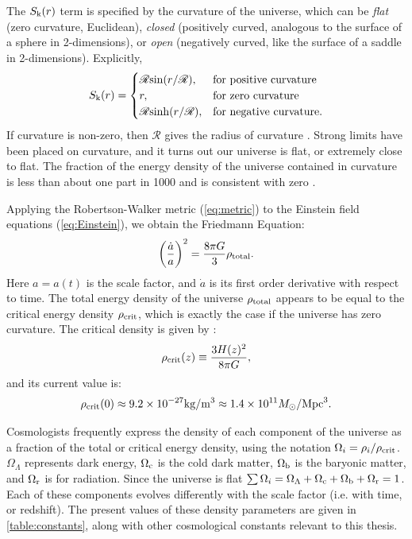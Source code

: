 The $S_{\rm k}(r)$ term is specified by the curvature of the universe, which can be {\it flat} (zero curvature, Euclidean), {\it closed} (positively curved, analogous to the surface of a sphere in 2-dimensions), or {\it open} (negatively curved, like the surface of a saddle in 2-dimensions). Explicitly,
\begin{equation}
S_{\rm k}(r) = 
    \begin{cases}
        \mathscr{R}{\rm sin}(r/\mathscr{R}), & \text{for positive curvature} \\
        r,              & \text{for zero curvature} \\
        \mathscr{R}{\rm sinh}(r/\mathscr{R}), & \text{for negative curvature.}
    \end{cases}
\end{equation}
If curvature is non-zero, then $\mathscr R$ gives the radius of curvature \citep{RydenText}. Strong limits have been placed on curvature, and it turns out our universe is flat, or extremely close to flat. The fraction of the energy density of the universe contained in curvature is less than about one part in 1000 and is consistent with zero \citep{PlanckXVI}.

Applying the Robertson-Walker metric (\autoref{eq:metric}) to the Einstein field equations (\autoref{eq:Einstein}), we obtain the Friedmann Equation:
\begin{equation}
\left( \frac{\dot a}{a} \right)^2 = \frac{8\pi G}{3} \rho_{\rm total}.
\end{equation}
Here $a=a(t)$ is the scale factor, and $\dot a$ is its first order derivative with respect to time. The total energy density of the universe $\rho_{\rm total}$ appears to be equal to the critical energy density $\rho_{\rm crit}$, which is exactly the case if the universe has zero curvature. The critical density is given by \citep{RydenText}:
\begin{equation}
\rho_{\rm crit}(z) \equiv \frac{3H(z)^2}{8\pi G},
\end{equation}
and its current value is:
\begin{equation}
\rho_{\rm crit}(0) \approx 9.2 \times 10^{-27} {\rm kg}/{\rm m}^{3} \approx 1.4 \times 10^{11} M_{\odot}/{\rm Mpc}^{3}.
\end{equation}

Cosmologists frequently express the density of each component of the universe as a fraction of the total or critical energy density, using the notation $\Omega_i = \rho_i / \rho_{\rm crit}$. $\Omega_{\Lambda}$ represents dark energy, $\Omega_{\rm c}$ is the cold dark matter, $\Omega_{\rm b}$ is the baryonic matter, and $\Omega_{\rm r}$ is for radiation. Since the universe is flat $\sum \Omega_i = \Omega_{\Lambda} + \Omega_{\rm c} + \Omega_{\rm b} + \Omega_{\rm r} =1$. Each of these components evolves differently with the scale factor (i.e. with time, or redshift). The present values of these density parameters are given in \autoref{table:constants}, along with other cosmological constants relevant to this thesis.


